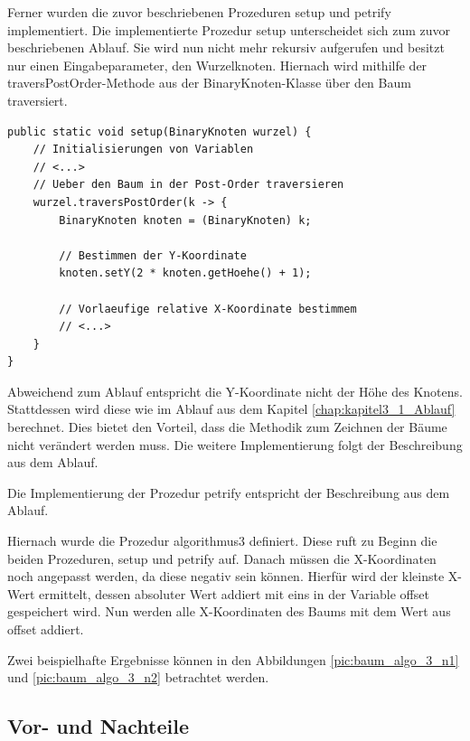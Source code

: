 Ferner wurden die zuvor beschriebenen Prozeduren \glqq setup\grqq{} und \glqq petrify\grqq{} implementiert. Die implementierte Prozedur
\glqq setup\grqq{} unterscheidet sich zum zuvor beschriebenen Ablauf. Sie wird nun nicht mehr rekursiv aufgerufen und besitzt 
nur einen Eingabeparameter, den Wurzelknoten. Hiernach wird mithilfe der \glqq traversPostOrder\grqq{}-Methode aus der 
BinaryKnoten-Klasse über den Baum traversiert.

\begin{lstlisting}[caption=Ausschnitt aus der setup-Prozedur, label=code:algo3_setup]
public static void setup(BinaryKnoten wurzel) {
    // Initialisierungen von Variablen
    // <...>
    // Ueber den Baum in der Post-Order traversieren
    wurzel.traversPostOrder(k -> {
        BinaryKnoten knoten = (BinaryKnoten) k;

        // Bestimmen der Y-Koordinate
        knoten.setY(2 * knoten.getHoehe() + 1);

        // Vorlaeufige relative X-Koordinate bestimmem
        // <...>
    }
}
\end{lstlisting}

Abweichend zum Ablauf entspricht die Y-Koordinate nicht der Höhe des Knotens. Stattdessen wird diese wie im 
Ablauf aus dem Kapitel \ref{chap:kapitel3_1_Ablauf} berechnet. Dies bietet den Vorteil, 
dass die Methodik zum Zeichnen der Bäume nicht verändert werden muss. Die weitere Implementierung folgt 
der Beschreibung aus dem Ablauf.

Die Implementierung der Prozedur \glqq petrify\grqq{} entspricht der Beschreibung aus dem Ablauf.

Hiernach wurde die Prozedur \glqq algorithmus3\grqq{} definiert. Diese ruft zu Beginn die beiden Prozeduren, 
\glqq setup\grqq{} und \glqq petrify\grqq{} auf. Danach müssen die X-Koordinaten noch angepasst werden, da diese 
negativ sein können. Hierfür wird der kleinste X-Wert ermittelt, dessen absoluter Wert 
addiert mit eins in der Variable \glqq offset\grqq{} gespeichert wird. Nun werden alle X-Koordinaten des 
Baums mit dem Wert aus \glqq offset\grqq{} addiert. 

Zwei beispielhafte Ergebnisse können in den Abbildungen \ref{pic:baum_algo_3_n1} 
und \ref{pic:baum_algo_3_n2} betrachtet werden. 


\subsection{Vor- und Nachteile}

